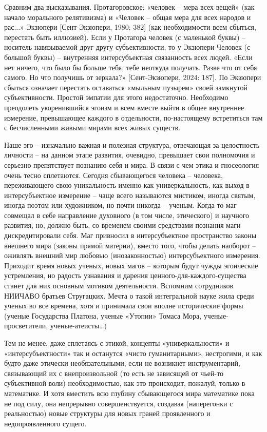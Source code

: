     Сравним два высказывания. Протагоровское: «человек – мера всех вещей» (как начало морального релятивизма) и «Человек – общая мера для всех народов и рас...» Экзюпери [Сент-Экзюпери, 1980: 382] (как необходимости всем сбыться, перестать быть иллюзией). Если у Протагора человек (с маленькой буквы) – носитель навязываемой друг другу субъективности, то у Экзюпери Человек (с большой буквы) – внутренняя интерсубъектная связанность всех людей. «Если нет ничего, что было бы больше тебя, тебе неоткуда получать. Разве что от себя самого. Но что получишь от зеркала?» [Сент-Экзюпери, 2024: 187]. По Экзюпери сбыться означает перестать оставаться «мыльным пузырем» своей замкнутой субъективности. Простой эмпатии для этого недостаточно. Необходимо преодолеть укоренившийся эгоизм и всем вместе выйти в общее внутреннее измерение, превышающее каждого в отдельности, по-настоящему встретиться там с бесчисленными живыми мирами всех живых существ.

    Наше эго – изначально важная и полезная структура, отвечающая за целостность личности – на данном этапе развития, очевидно, превышает свои полномочия и серьезно препятствует познанию себя и мира. В связи с чем этика и гносеология очень тесно сплетаются. Сегодня сбывающегося человека – человека, переживающего свою уникальность именно как универкальность, как выход в интерсубъектное измерение – чаще всего называются мистиком, иногда святым, иногда поэтом или художником, но почти никогда – ученым. Когда-то маг совмещал в себе направление духовного (в том числе, этического) и научного развития, но, должно быть, со временем своими средствами познания маги дискредитировали себя. Маг привносил в интерсубъектное пространство законы внешнего мира (законы прямой материи), вместо того, чтобы делать наоборот – оживлять внешний мир любовью (инозаконностью) интерсубъектного измерения. Приходит время новых ученых, новых магов – которым будут чужды эгоические устремления, но радость узнавания и дарения ценного-для-каждого-существа станет для них основным мотивом деятельности. Вспомним сотрудников НИИЧАВО братьев Стругацких. Мечта о такой интегральной науке жила среди ученых во все времена, хотя и принимала свои вполне исторические формы (ученые Государства Платона, ученые «Утопии» Томаса Мора, ученые-просветители, ученые-атеисты…)

    Тем не менее, даже сплетаясь с этикой, концепты «универкальности» и «интерсубъектности» так и останутся «чисто гуманитарными», нестрогими, и как будто даже этически необязательными, если не возникнет инструментарий, связывающий их с внепроизвольной (то есть не зависящей от чьей-то субъективной воли) необходимостью, как это происходит, пожалуй, только в математике. И хотя вместить всю глубину сбывающегося мира математике пока не под силу, она непрерывно совершенствуется, создавая (наперегонки с реальностью) новые структуры для новых граней проявленного и недопроявленного сущего.

